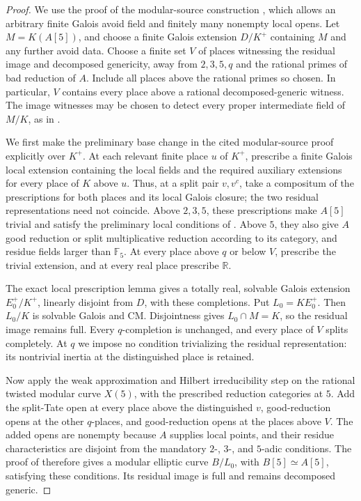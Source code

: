 \documentclass[11pt,a4paper]{article}
\numberwithin{equation}{section}
\begin{document}
\begin{proof}
We use the proof of the modular-source construction \cite[Proposition~6.1.5]{CN}, which allows an arbitrary finite Galois avoid field and finitely many nonempty local opens. Let \(M=K(A[5])\), and choose a finite Galois extension \(D/K^+\) containing \(M\) and any further avoid data. Choose a finite set \(V\) of places witnessing the residual image and decomposed genericity, away from \(2,3,5,q\) and the rational primes of bad reduction of \(A\). Include all places above the rational primes so chosen. In particular, \(V\) contains every place above a rational decomposed-generic witness. The image witnesses may be chosen to detect every proper intermediate field of \(M/K\), as in \cite[\S6.5.12]{ACC}.

We first make the preliminary base change in the cited modular-source proof explicitly over \(K^+\). At each relevant finite place \(u\) of \(K^+\), prescribe a finite Galois local extension containing the local fields and the required auxiliary extensions for every place of \(K\) above \(u\). Thus, at a split pair \(v,v^c\), take a compositum of the prescriptions for both places and its local Galois closure; the two residual representations need not coincide. Above \(2,3,5\), these prescriptions make \(A[5]\) trivial and satisfy the preliminary local conditions of \cite[Proposition~6.1.5]{CN}. Above \(5\), they also give \(A\) good reduction or split multiplicative reduction according to its category, and residue fields larger than \(\mathbb F_5\). At every place above \(q\) or below \(V\), prescribe the trivial extension, and at every real place prescribe \(\mathbb R\).

The exact local prescription lemma \cite[Lemma~4.1.2]{CHT} gives a totally real, solvable Galois extension \(E_0^+/K^+\), linearly disjoint from \(D\), with these completions. Put \(L_0=KE_0^+\). Then \(L_0/K\) is solvable Galois and CM. Disjointness gives \(L_0\cap M=K\), so the residual image remains full. Every \(q\)-completion is unchanged, and every place of \(V\) splits completely. At \(q\) we impose no condition trivializing the residual representation: its nontrivial inertia at the distinguished place is retained.

Now apply the weak approximation and Hilbert irreducibility step on the rational twisted modular curve \(X(5)\), with the prescribed reduction categories at \(5\). Add the split-Tate open at every place above the distinguished \(v\), good-reduction opens at the other \(q\)-places, and good-reduction opens at the places above \(V\). The added opens are nonempty because \(A\) supplies local points, and their residue characteristics are disjoint from the mandatory \(2\)-, \(3\)-, and \(5\)-adic conditions. The proof of \cite[Proposition~6.1.5]{CN} therefore gives a modular elliptic curve \(B/L_0\), with \(B[5]\simeq A[5]\), satisfying these conditions. Its residual image is full and remains decomposed generic.


\end{proof}
\end{document}
